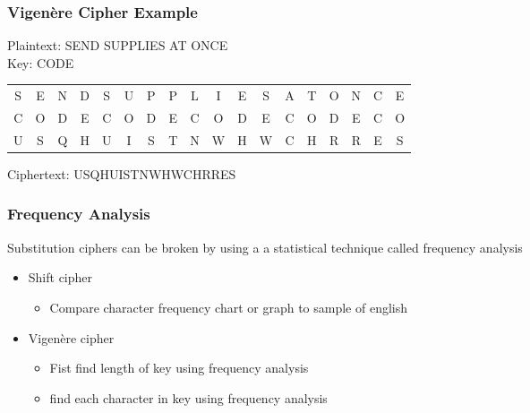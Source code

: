\documentclass[12pt]{beamer}
\begin{document}
\begin{frame}
	\frametitle{Vigen\`{e}re Cipher Example}
	Plaintext: SEND SUPPLIES AT ONCE\\
	Key: CODE
	
	\begin{center}
		\begin{adjustbox}{max width=\textwidth}
			\begin{tabular}{cccccccccccccccccc}
				S&E&N&D&S&U&P&P&L&I&E&S&A&T&O&N&C&E\\
				C&O&D&E&C&O&D&E&C&O&D&E&C&O&D&E&C&O\\
				\hline
				U&S&Q&H&U&I&S&T&N&W&H&W&C&H&R&R&E&S
			\end{tabular}
		\end{adjustbox}
	\end{center}

	Ciphertext: USQHUISTNWHWCHRRES
	
\end{frame}

\begin{frame}
	\frametitle{Frequency Analysis}
	Substitution ciphers can be broken by using a a statistical technique called frequency analysis
	\begin{itemize}
		\item Shift cipher
		\begin{itemize}
			\item Compare character frequency chart or graph to sample of english
		\end{itemize}
	\item Vigen\`{e}re cipher
	\begin{itemize}
		\item Fist find length of key using frequency analysis
		\item find each character in key using frequency analysis
	\end{itemize}
	\end{itemize}
\end{frame}
\end{document}
